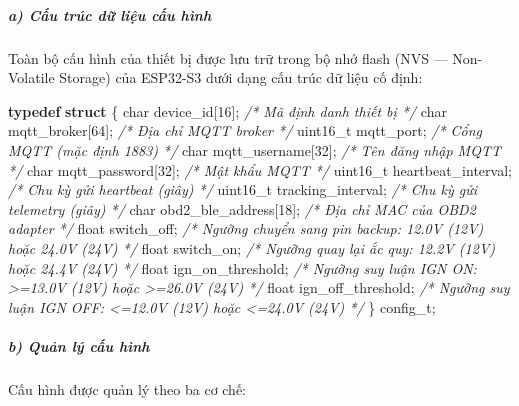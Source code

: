 \documentclass[13pt,a4paper]{extarticle}
\newenvironment{Shaded}{}{}
\newcommand{\CommentTok}[1]{\textcolor[rgb]{0.38,0.63,0.69}{\textit{#1}}}
\newcommand{\DataTypeTok}[1]{\textcolor[rgb]{0.56,0.13,0.00}{#1}}
\newcommand{\DecValTok}[1]{\textcolor[rgb]{0.25,0.63,0.44}{#1}}
\newcommand{\KeywordTok}[1]{\textcolor[rgb]{0.00,0.44,0.13}{\textbf{#1}}}
\newcommand{\NormalTok}[1]{#1}
\newcommand{\OperatorTok}[1]{\textcolor[rgb]{0.40,0.40,0.40}{#1}}
\renewcommand{\\}{\thesislongtableorignewline\hline}%
\begin{document}
\subparagraph{a) Cấu trúc dữ liệu cấu
hình}\label{a-cux1ea5u-truxfac-dux1eef-liux1ec7u-cux1ea5u-huxecnh}

Toàn bộ cấu hình của thiết bị được lưu trữ trong bộ nhớ flash (NVS ---
Non-Volatile Storage) của ESP32-S3 dưới dạng cấu trúc dữ liệu cố định:

\begin{Shaded}
\begin{Highlighting}[]
\KeywordTok{typedef} \KeywordTok{struct} \OperatorTok{\{}
    \DataTypeTok{char}\NormalTok{     device\_id}\OperatorTok{[}\DecValTok{16}\OperatorTok{];}          \CommentTok{/* Mã định danh thiết bị */}
    \DataTypeTok{char}\NormalTok{     mqtt\_broker}\OperatorTok{[}\DecValTok{64}\OperatorTok{];}        \CommentTok{/* Địa chỉ MQTT broker */}
    \DataTypeTok{uint16\_t}\NormalTok{ mqtt\_port}\OperatorTok{;}              \CommentTok{/* Cổng MQTT (mặc định 1883) */}
    \DataTypeTok{char}\NormalTok{     mqtt\_username}\OperatorTok{[}\DecValTok{32}\OperatorTok{];}      \CommentTok{/* Tên đăng nhập MQTT */}
    \DataTypeTok{char}\NormalTok{     mqtt\_password}\OperatorTok{[}\DecValTok{32}\OperatorTok{];}      \CommentTok{/* Mật khẩu MQTT */}
    \DataTypeTok{uint16\_t}\NormalTok{ heartbeat\_interval}\OperatorTok{;}     \CommentTok{/* Chu kỳ gửi heartbeat (giây) */}
    \DataTypeTok{uint16\_t}\NormalTok{ tracking\_interval}\OperatorTok{;}      \CommentTok{/* Chu kỳ gửi telemetry (giây) */}
    \DataTypeTok{char}\NormalTok{     obd2\_ble\_address}\OperatorTok{[}\DecValTok{18}\OperatorTok{];}   \CommentTok{/* Địa chỉ MAC của OBD2 adapter */}
    \DataTypeTok{float}\NormalTok{    switch\_off}\OperatorTok{;}             \CommentTok{/* Ngưỡng chuyển sang pin backup: 12.0V (12V) hoặc 24.0V (24V) */}
    \DataTypeTok{float}\NormalTok{    switch\_on}\OperatorTok{;}              \CommentTok{/* Ngưỡng quay lại ắc quy: 12.2V (12V) hoặc 24.4V (24V) */}
    \DataTypeTok{float}\NormalTok{    ign\_on\_threshold}\OperatorTok{;}       \CommentTok{/* Ngưỡng suy luận IGN ON: \textgreater{}=13.0V (12V) hoặc \textgreater{}=26.0V (24V) */}
    \DataTypeTok{float}\NormalTok{    ign\_off\_threshold}\OperatorTok{;}      \CommentTok{/* Ngưỡng suy luận IGN OFF: \textless{}=12.0V (12V) hoặc \textless{}=24.0V (24V) */}
\OperatorTok{\}}\NormalTok{ config\_t}\OperatorTok{;}
\end{Highlighting}
\end{Shaded}

\subparagraph{b) Quản lý cấu
hình}\label{b-quux1ea3n-luxfd-cux1ea5u-huxecnh}

Cấu hình được quản lý theo ba cơ chế:
\end{document}
